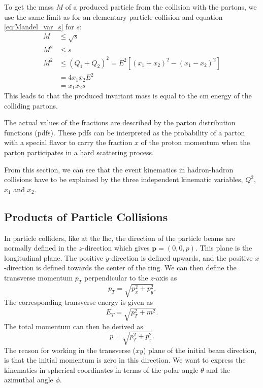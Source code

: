 \documentclass[a4paper, american, 12pt]{report}
\begin{document}
	To get the mass $M$ of a produced particle from the collision with the partons, we use the same limit as for an elementary particle collision and equation \ref{eq:Mandel_var_s} for $s$:
	\begin{align*}
		M&\leq\sqrt{s}\\
		M^2&\leq s\\
		M^2&\leq (Q_1+Q_2)^2=E^2\left[(x_1+x_2)^2-(x_1-x_2)^2\right]\\
		&=4x_1x_2E^2\\
		&=x_1x_2s
	\end{align*}
	This leads to that the produced invariant mass is equal to the \acrshort{cm} energy of the colliding partons.	

	The actual values of the fractions are described by the parton distribution functions (\acrshort{pdf}s). These \acrshort{pdf}s can be interpreted as the probability of a parton with a special flavor to carry the fraction $x$ of the proton momentum when the parton participates in a hard scattering process. 

	From this section, we can see that the event kinematics in hadron-hadron collisions have to be explained by the three independent kinematic variables, $Q^2$, $x_1$ and $x_2$.


	\subsection{Products of Particle Collisions}
	\label{subsect:Theory-Collision_products}
	In particle colliders, like at the \acrshort{lhc}, the direction of the particle beams are normally defined in the $z$-direction which gives $\textbf{p}=(0,0,p)$. This plane is the longitudinal plane. The positive $y$-direction is defined upwards, and the positive $x$-direction is defined towards the center of the ring. We can then define the transverse momentum $p_T$ perpendicular to the $z$-axis as
	\begin{equation}
	\label{eq:Transvesre_p}
		p_T=\sqrt{p_x^2+p_y^2}.
	\end{equation}
	The corresponding transverse energy is given as 
	\begin{equation}
	\label{eq:Transverse_E}
		E_T=\sqrt{p_T^2+m^2}.
	\end{equation}
	The total momentum can then be derived as 
	\begin{equation}
	\label{eq:Total_mom}
		p=\sqrt{p_T^2+p_z^2}.
	\end{equation}
	The reason for working in the transverse ($xy$) plane of the initial beam direction, is that the initial momentum is zero in this direction. We want to express the kinematics in spherical coordinates in terms of the polar angle $\theta$ and the azimuthal angle $\phi$. 
\end{document}
